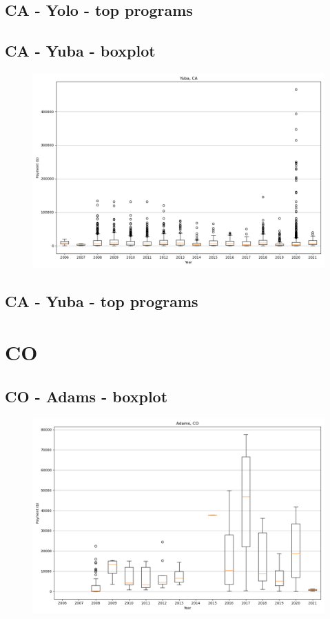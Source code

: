 \subsection*{CA - Yolo - top programs}

\newpage
\subsection*{CA - Yuba - boxplot}
\begin{figure}[h]
\centering
\includegraphics[width=7in]{../output/boxplots/counties/Yuba-CA_boxplot.png}
\end{figure}


\subsection*{CA - Yuba - top programs}

\newpage
\section*{CO}
\subsection*{CO - Adams - boxplot}
\begin{figure}[h]
\centering
\includegraphics[width=7in]{../output/boxplots/counties/Adams-CO_boxplot.png}
\end{figure}


